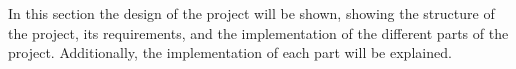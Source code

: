 In this 
section 
the design of the project will be 
shown, showing 
the structure of the project, its requirements, and the implementation of the different parts of the project. Additionally, the implementation of each part will be explained.